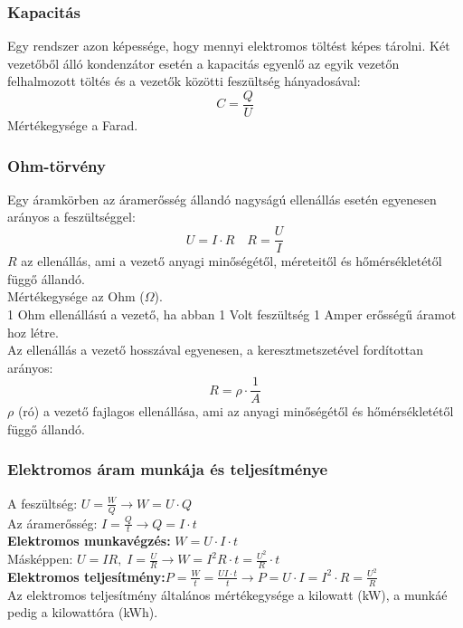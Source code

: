\subsubsection{Kapacitás}
Egy rendszer azon képessége, hogy mennyi elektromos töltést képes tárolni. Két vezetőből álló kondenzátor esetén a kapacitás egyenlő az egyik vezetőn felhalmozott töltés és a vezetők közötti feszültség hányadosával:
$$ C = \frac{Q}{U} $$
Mértékegysége a Farad.

\subsubsection{Ohm-törvény}
Egy áramkörben az áramerősség állandó nagyságú ellenállás esetén egyenesen arányos a feszültséggel:
$$U = I \cdot R \quad R = \frac{U}{I}$$
$R$ az ellenállás, ami a vezető anyagi minőségétől, méreteitől és hőmérsékletétől függő állandó.\\
Mértékegysége az Ohm ($\Omega$).\\
1 Ohm ellenállású a vezető, ha abban 1 Volt feszültség 1 Amper erősségű áramot hoz létre.\\
Az ellenállás a vezető hosszával egyenesen, a keresztmetszetével fordítottan arányos:
$$ R = \rho \cdot \frac{1}{A} $$
$\rho$ (ró) a vezető fajlagos ellenállása, ami az anyagi minőségétől és hőmérsékletétől függő állandó.

\subsubsection{Elektromos áram munkája és teljesítménye}
A feszültség: $U = \frac{W}{Q} \rightarrow W = U \cdot Q$\\
Az áramerősség: $I = \frac{Q}{t} \rightarrow Q = I \cdot t$\\
\textbf{Elektromos munkavégzés:} $W = U \cdot I \cdot t$\\
Másképpen: $U = IR,\;I=\frac{U}{R} \rightarrow W = I^2R\cdot t = \frac{U^2}{R} \cdot t$\\
\textbf{Elektromos teljesítmény:}$P=\frac{W}{t}=\frac{UI\cdot t}{t} \rightarrow P=U\cdot I = I^2\cdot R = \frac{U^2}{R}$\\
Az elektromos teljesítmény általános mértékegysége a kilowatt (kW), a munkáé pedig a kilowattóra (kWh).

